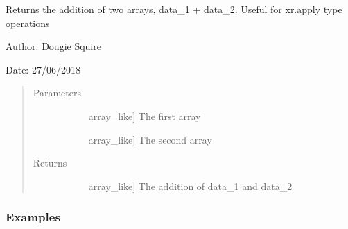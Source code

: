 \documentclass[letterpaper,10pt,english]{sphinxmanual}
\begin{document}
\begin{fulllineitems}
\label{\detokenize{utils_doc:utils.add}}
Returns the addition of two arrays, data\_1 + data\_2. Useful for xr.apply type operations

\begin{DUlineblock}{0em}
\item[] Author: Dougie Squire
\item[] Date: 27/06/2018
\end{DUlineblock}
\begin{quote}\begin{description}
\item[{Parameters}] \leavevmode\begin{description}
\item[{}] \leavevmode{[}array\_like{]}
The first array

\item[{}] \leavevmode{[}array\_like{]}
The second array

\end{description}

\item[{Returns}] \leavevmode\begin{description}
\item[{}] \leavevmode{[}array\_like{]}
The addition of data\_1 and data\_2

\end{description}

\end{description}\end{quote}
\subsubsection*{Examples}


\end{fulllineitems}
\end{document}
